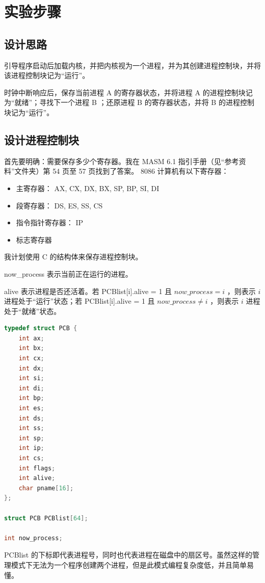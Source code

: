 \documentclass{article}
\begin{document}
\section{实验步骤}

\subsection{设计思路}

引导程序启动后加载内核，并把内核视为一个进程，并为其创建进程控制块，并将该进程控制块记为“运行”。

时钟中断响应后，保存当前进程 A 的寄存器状态，并将进程 A 的进程控制块记为“就绪”；寻找下一个进程 B ；还原进程 B 的寄存器状态，并将 B 的进程控制块记为“运行”。

\subsection{设计进程控制块}

首先要明确：需要保存多少个寄存器。我在 MASM 6.1 指引手册（见“参考资料”文件夹）第 54 页至 57 页找到了答案。 8086 计算机有以下寄存器：

\begin{itemize}
\item 主寄存器： AX, CX, DX, BX, SP, BP, SI, DI
\item 段寄存器： DS, ES, SS, CS
\item 指令指针寄存器： IP
\item 标志寄存器
\end{itemize}

我计划使用 C 的结构体来保存进程控制块。

now\_process 表示当前正在运行的进程。

alive 表示进程是否还活着。若 PCBlist[i].alive = 1 且 $now\_process = i$ ，则表示 $i$ 进程处于“运行”状态；若 PCBlist[i].alive = 1 且 $now\_process \neq i$ ，则表示 $i$ 进程处于“就绪”状态。

\begin{lstlisting}[language=C]
typedef struct PCB {
	int ax;
	int bx;
	int cx;
	int dx;
	int si;
	int di;
	int bp;
	int es;
	int ds;
	int ss;
	int sp;
	int ip;
	int cs;
	int flags;
	int alive;
	char pname[16];
};

struct PCB PCBlist[64];

int now_process;
\end{lstlisting}

PCBlist 的下标即代表进程号，同时也代表进程在磁盘中的扇区号。虽然这样的管理模式下无法为一个程序创建两个进程，但是此模式编程复杂度低，并且简单易懂。
\end{document}
